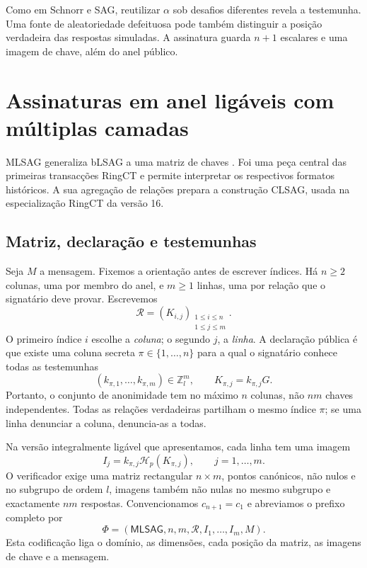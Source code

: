 Como em Schnorr e SAG, reutilizar \(\alpha\) sob desafios diferentes revela a
testemunha. Uma fonte de aleatoriedade defeituosa pode também distinguir a
posição verdadeira das respostas simuladas. A assinatura guarda
\(n+1\) escalares e uma imagem de chave, além do anel público.

\section{Assinaturas em anel ligáveis com múltiplas camadas}
\label{sec:MLSAG}

MLSAG generaliza bLSAG a uma matriz de chaves
\cite{MRL-0005-ringct}. Foi uma peça central das primeiras transacções
RingCT e permite interpretar os respectivos formatos históricos. A sua
agregação de relações prepara a construção CLSAG, usada na especialização
RingCT da versão 16.

\subsection*{Matriz, declaração e testemunhas}

Seja \(M\) a mensagem. Fixemos a orientação antes de escrever
índices. Há \(n\geq2\) colunas, uma
por membro do anel, e \(m\geq1\) linhas, uma por relação que o signatário deve
provar. Escrevemos
\[
\mathcal R=(K_{i,j})_
 {\substack{1\leq i\leq n\\1\leq j\leq m}}.
\]
O primeiro índice \(i\) escolhe a \emph{coluna}; o segundo \(j\), a
\emph{linha}. A declaração pública é que existe uma coluna secreta
\(\pi\in\{1,\ldots,n\}\) para a qual o signatário conhece todas as
testemunhas
\[
(k_{\pi,1},\ldots,k_{\pi,m})\in\mathbb Z_l^m,
\qquad K_{\pi,j}=k_{\pi,j}G.
\]
Portanto, o conjunto de anonimidade tem no máximo \(n\) colunas, não
\(nm\) chaves independentes. Todas as relações verdadeiras partilham o mesmo
índice \(\pi\); se uma linha denunciar a coluna, denuncia-as a todas.

Na versão integralmente ligável que apresentamos, cada linha tem uma imagem
\[
I_j=k_{\pi,j}\mathcal H_p(K_{\pi,j}),
\qquad j=1,\ldots,m.
\]
O verificador exige uma matriz rectangular \(n\times m\), pontos canónicos,
não nulos e no subgrupo de ordem \(l\), imagens também não nulas no mesmo
subgrupo e exactamente \(nm\) respostas. Convencionamos \(c_{n+1}=c_1\) e
abreviamos o prefixo completo por
\[
\Phi=(\mathsf{MLSAG},n,m,\mathcal R,I_1,\ldots,I_m,M).
\]
Esta codificação liga o domínio, as dimensões, cada posição da matriz, as
imagens de chave e a mensagem.

